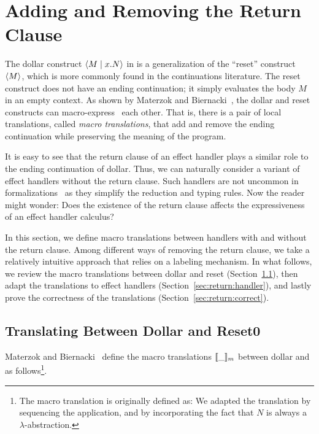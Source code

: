 \section{Adding and Removing the Return Clause}
\label{sec:return}

The dollar construct $\langle M \mid x.N \rangle$ in \lambdasz is a
generalization of the ``reset'' construct $\langle M \rangle$, which is more
commonly found in the continuations literature.
The reset construct does not have an ending continuation; it simply
evaluates the body $M$ in an empty context.
As shown by Materzok and Biernacki~\cite{materzok-axiom}, the dollar and
reset constructs can macro-express~\cite{felleisen-macro} each other.
That is, there is a pair of local translations, called \textit{macro
translations}, that add and remove the ending continuation while preserving
the meaning of the program.

It is easy to see that the return clause of an effect handler plays a
similar role to the ending continuation of dollar.
Thus, we can naturally consider a variant of effect handlers without the
return clause.
Such handlers are not uncommon in
formalizations~\cite{schuster-capability,xie-evidently,zhang-bidirectional}
as they simplify the reduction and typing rules.
Now the reader might wonder: Does the existence of the return clause affects
the expressiveness of an effect handler calculus?

In this section, we define macro translations between handlers with and
without the return clause.
Among different ways of removing the return clause, we take a relatively 
intuitive approach that relies on a labeling mechanism.
In what follows, we review the macro translations between dollar and reset
(Section~\ref{sec:return:dollar}), then adapt the translations to effect
handlers (Section~\ref{sec:return:handler}), and lastly prove the
correctness of the translations (Section~\ref{sec:return:correct}).


\subsection{Translating Between Dollar and Reset0}
\label{sec:return:dollar}

Materzok and Biernacki~\cite{materzok-hierarchy} define the macro
translations $\llbracket \_ \rrbracket_m$ between dollar and \resetztt as
follows\footnote{The macro translation is originally defined as:
We adapted the translation by sequencing the application, and by incorporating
the fact that $N$ is always a $\lambda$-abstraction.}.

